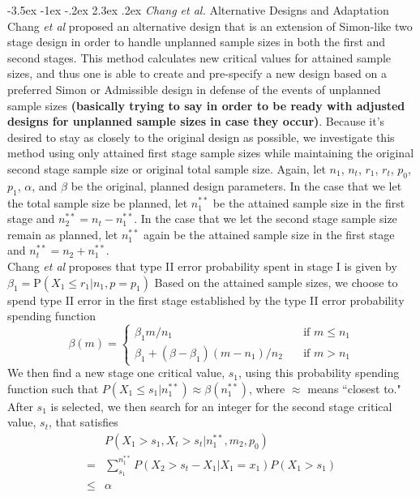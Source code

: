 \documentclass[12pt]{report}\usepackage[]{graphicx}\usepackage[]{color}
\makeatletter
\newlength{\li}\setlength{\li}{14.48pt}
\newlength{\di}\setlength{\di}{-3.5mm}
\renewcommand\section{ \@startsection {section}{1}{\z@}%
                                   {-3.5ex \@plus -1ex \@minus -.2ex}%
                                   {2.3ex \@plus.2ex}%
                                   {\centering\large\fontfamily{qcs}\selectfont}}
\makeatother
\begin{document}
\section{\textit{Chang et al.} Alternative Designs and Adaptation}
Chang \textit{et al} \cite{Chang} proposed an alternative design that is an extension of Simon-like two stage design in order to handle unplanned sample sizes in both the first and second stages. This method calculates new critical values for attained sample sizes, and thus one is able to create and pre-specify a new design based on a preferred Simon or Admissible design in defense of the events of unplanned sample sizes \textbf{(basically trying to say in order to be ready with adjusted designs for unplanned sample sizes in case they occur)}. Because it's desired to stay as closely to the original design as possible, we investigate this method using only attained first stage sample sizes while maintaining the original second stage sample size or original total sample size. Again, let $n_1$, $n_t$, $r_1$, $r_t$, $p_0$, $p_1$, $\alpha$, and $\beta$ be the original, planned design parameters. In the case that we let the total sample size be planned, let $n_1^{\ast \ast}$ be the attained sample size in the first stage and $n_2^{\ast\ast} = n_t - n_1^{\ast\ast}$. In the case that we let the second stage sample size remain as planned, let $n_1^{\ast\ast}$ again be the attained sample size in the first stage and $n_t^{\ast\ast} = n_2 + n_1^{\ast\ast}$. \\
\indent Chang \textit{et al} proposes that type II error probability spent in stage I is given by $\beta_1 = \mbox{P}(X_1 \leq r_1 \vert n_1, p = p_1)$ Based on the attained sample sizes, we choose to spend type II error in the first stage established by the type II error probability spending function 
$$
\beta(m) = \left\{
        \begin{array}{ll}
            \beta_1 m/n_1 & \quad \text{if } m\leq n_1 \\
            \beta_1 + (\beta - \beta_1)(m - n_1)/n_2 & \quad \text{if } m > n_1
        \end{array}
    \right.
$$
We then find a new stage one critical value, $s_1$, using this probability spending function such that $P(X_1 \leq s_1 | n_1^{\ast\ast}) \approx \beta(n_1^{\ast\ast})$, where $\approx$ means ``closest to." After $s_1$ is selected, we then search for an integer for the second stage critical value, $s_t$, that satisfies
\begin{equation*}
\begin{aligned}
& P(X_1 > s_1, X_t > s_t | n_1^{\ast\ast}, m_2, p_0) \\
= & \sum_{s_1}^{n_1^{\ast\ast}} P(X_2 > s_t - X_1 | X_1 = x_1) P(X_1 > s_1) \\
 \leq & \alpha \\
\end{aligned}
\end{equation*}
\end{document}
